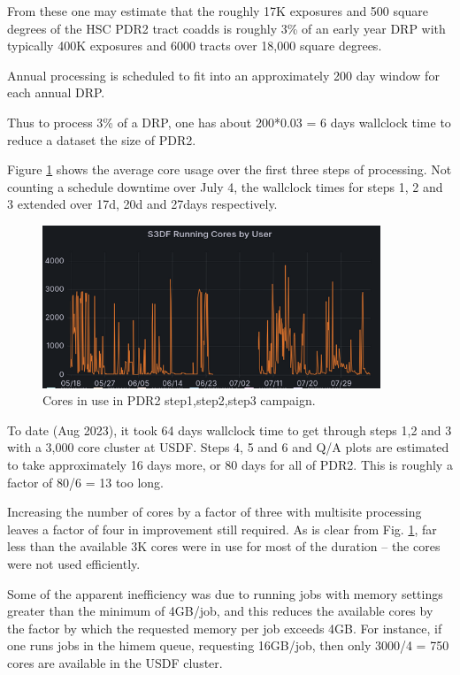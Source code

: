 From these one may estimate that the roughly 17K exposures and 500 
square degrees of the HSC PDR2 tract coadds is roughly 3\% of an 
early year DRP with typically 400K exposures and 6000 tracts 
over 18,000 square degrees.

Annual processing is scheduled to fit into an approximately 200 day window
for each annual DRP.

Thus to process 3\% of a DRP, one has about 200*0.03 = 6 days wallclock time
to reduce a dataset the size of PDR2.

Figure \ref{fig:cores} shows the average core usage over the first
three steps of processing.  Not counting a schedule downtime 
over July 4, the wallclock times for steps 1, 2 and 3 extended over
17d, 20d and 27days respectively.

\begin{figure}[hbt!]
\includegraphics[width=0.9\textwidth]{Campcorespdr2.png}
\caption{Cores in use in PDR2 step1,step2,step3 campaign.}  \label{fig:cores}
\end{figure}

To date (Aug 2023), it took 64 days wallclock time to get through 
steps 1,2 and 3 with a 3,000 core cluster at USDF.  
Steps 4, 5 and 6 and Q/A plots are estimated to take approximately 
16 days more, or 80 days for all of PDR2.   This is roughly a 
factor of 80/6 = 13 too long.

Increasing the number of cores by a factor of three with multisite processing
leaves a factor of four in improvement still required.
As is clear from Fig. \ref{fig:cores}, far less than the available 3K cores
were in use for most of the duration -- the cores were not used
efficiently.

Some of the apparent inefficiency was due to running jobs with memory
settings greater than the minimum of 4GB/job, and this reduces the available
cores by the factor by which the requested memory per job exceeds 4GB.
For instance, if one runs jobs in the himem queue, requesting 16GB/job,
then only 3000/4 = 750 cores are available in the USDF cluster.

